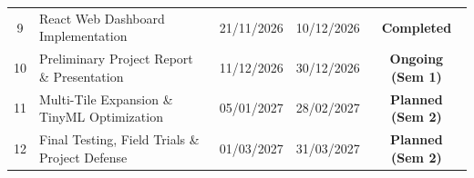 \begin{table}[H]
\begin{tabularx}{\textwidth}{@{} c Y c c c @{}}
9 & React Web Dashboard Implementation & 21/11/2026 & 10/12/2026 & \textcolor{passgreen}{\textbf{Completed}} \\
10 & Preliminary Project Report \& Presentation & 11/12/2026 & 30/12/2026 & \textcolor{amber}{\textbf{Ongoing (Sem 1)}} \\
11 & Multi-Tile Expansion \& TinyML Optimization & 05/01/2027 & 28/02/2027 & \textcolor{profblue}{\textbf{Planned (Sem 2)}} \\
12 & Final Testing, Field Trials \& Project Defense & 01/03/2027 & 31/03/2027 & \textcolor{profblue}{\textbf{Planned (Sem 2)}} \\
\bottomrule
\end{tabularx}
\end{table}

